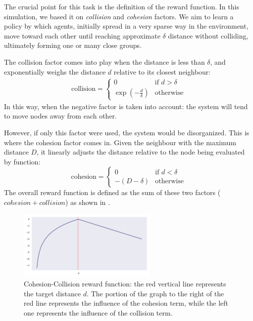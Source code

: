 The crucial point for this task is
 the definition of the reward function. 
 In this simulation, we based it on \emph{collision} and \emph{cohesion} factors. 
%
We aim to learn a policy by which agents, initially spread in a very sparse way in the environment, move toward each other until reaching approximate $\delta$  distance without colliding, ultimately forming one or many close groups.
%

The collision factor comes into play when the distance is less than $\delta$, 
 and exponentially weighs the distance $d$ relative to its closest neighbour:
\begin{equation}
    \label{eq:collision-factor}
    \begin{split}
        \text{collision} = \begin{cases}
            0 & \text{if } d > \delta \\
            \exp\left(-\frac{d}{\delta}\right) & \text{otherwise}
        \end{cases}
    \end{split}
\end{equation}
In this way, when the negative factor is taken into account: 
 the system will tend to move nodes away from each other.

However, if only this factor were used, 
 the system would be disorganized. 
 This is where the cohesion factor comes in. 
 Given the neighbour with the maximum distance $D$, 
 it linearly adjusts the distance relative to the node being evaluated by function:
\begin{equation}
    \text{cohesion} = \begin{cases}
        0 & \text{if } d < \delta \\
        -(D - \delta) & \text{otherwise}
    \end{cases}
\end{equation}
%
The overall reward function is defined as the sum of these two factors ($cohesion + collision$)
 as shown in .
 \begin{figure}[t]
    \centering
    \includegraphics[width=0.6\textwidth]{papers/coordination2023/imgs/ccreward.pdf}
    \caption[cohesion collision reward function]{Cohesion-Collision reward function: the red vertical line represents the target distance $d$.
        The portion of the graph to the right of the red line represents the influence of the cohesion term,
        while the left one represents the influence of the collision term.
    }
    \label{fig:cc-rf}
\end{figure}


